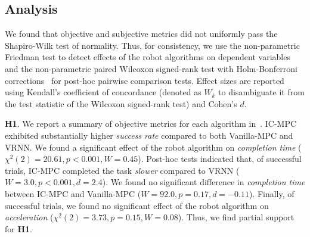 \subsection{Analysis}

We found that objective and subjective metrics did not uniformly pass the Shapiro-Wilk test of normality. Thus, for consistency, we use the non-parametric Friedman test to detect effects of the robot algorithms on dependent variables and the non-parametric paired Wilcoxon signed-rank test with Holm-Bonferroni corrections~\citep{holm1979simple} for post-hoc pairwise comparison tests. Effect sizes are reported using Kendall's coefficient of concordance (denoted as $W_k$ to disambiguate it from the test statistic of the Wilcoxon signed-rank test) and Cohen's $d$.

\textbf{H1}.
We report a summary of objective metrics for each algorithm in~.
IC-MPC exhibited substantially higher \emph{success rate} compared to both Vanilla-MPC and VRNN.
We found a significant effect of the robot algorithm on \emph{completion time} ($\chi^2(2)=20.61, p < 0.001, W=0.45$). Post-hoc tests indicated that, of successful trials, IC-MPC completed the task \emph{slower} compared to VRNN ($W=3.0, p<0.001, d=2.4$).
We found no significant difference in \emph{completion time} between IC-MPC and Vanilla-MPC ($W=92.0, p=0.17, d=-0.11$). Finally, of successful trials, we found no significant effect of the robot algorithm on \emph{acceleration} ($\chi^2(2)= 3.73, p=0.15, W=0.08$).
Thus, we find partial support for \textbf{H1}.


\begin{table}
\centering
\caption{Mean and standard deviation of subjective metrics.\newline$^{*}p<.05$, $^{**}p<.01$, $^{***}p<.001$\label{table:h2-pairwise}}
\end{table}


